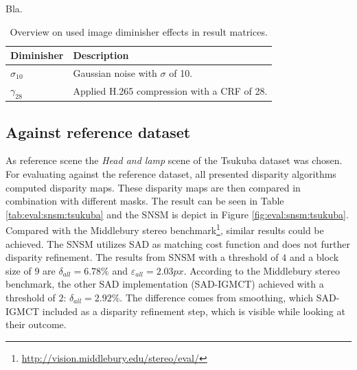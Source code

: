\noindent Bla.

\begin{table}[h!]
  \centering
  \begin{tabular}{l|l}
  \textbf{Diminisher} & \textbf{Description} \\ \hline \hline
  $\sigma_{10}$ & Gaussian noise with $\sigma$ of 10. \\ \hline
  $\gamma_{28}$ & Applied H.265 compression with a CRF of 28. \\ \hline
  \end{tabular}
  \caption{Overview on used image diminisher effects in result matrices.}
  \label{tab:metrics2}
\end{table}


\newpage
\subsection{Against reference dataset}

As reference scene the \textit{Head and lamp} scene of the Tsukuba dataset was chosen.
For evaluating against the reference dataset, all presented disparity algorithms computed disparity maps.
These disparity maps are then compared in combination with different masks.
The result can be seen in Table \ref{tab:eval:snsm:tsukuba} and the SNSM is depict in Figure \ref{fig:eval:snsm:tsukuba}.
Compared with the Middlebury stereo benchmark\footnote{\url{http://vision.middlebury.edu/stereo/eval/}}, similar results could be achieved.
The SNSM utilizes SAD as matching cost function and does not further disparity refinement.
The results from SNSM with a threshold of $4$ and a block size of $9$ are $\delta_{all} = 6.78\%$ and $\varepsilon_{all} = 2.03px$.
According to the Middlebury stereo benchmark, the other SAD implementation (SAD-IGMCT) \citep{ambrosch2010accurate} achieved with a threshold of $2$: $\delta_{all} = 2.92\%$.
The difference comes from smoothing, which SAD-IGMCT included as a disparity refinement step, which is visible while looking at their outcome.


